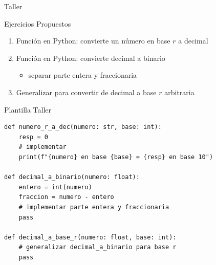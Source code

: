 \documentclass[presentation]{beamer}
\begin{document}
\begin{frame}[label={sec:org11413e2},fragile]{Taller}
 \begin{block}{Ejercicios Propuestos}
\begin{enumerate}
\item Función en Python: convierte un número en base \(r\) a decimal
\item Función en Python: convierte decimal a binario
\begin{itemize}
\item separar parte entera y fraccionaria
\end{itemize}
\item Generalizar para convertir de decimal a base \(r\) arbitraria
\end{enumerate}
\end{block}

\begin{block}{Plantilla Taller}
\begin{verbatim}
def numero_r_a_dec(numero: str, base: int):
    resp = 0
    # implementar
    print(f"{numero} en base {base} = {resp} en base 10")

def decimal_a_binario(numero: float):
    entero = int(numero)
    fraccion = numero - entero
    # implementar parte entera y fraccionaria
    pass

def decimal_a_base_r(numero: float, base: int):
    # generalizar decimal_a_binario para base r
    pass
\end{verbatim}
\end{block}
\end{frame}
\end{document}
